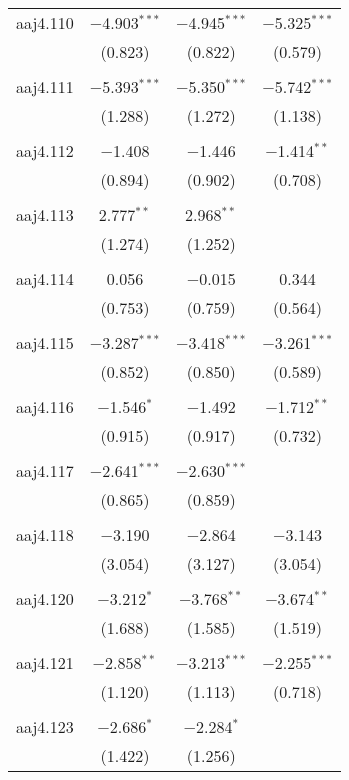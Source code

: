 \begin{table}[!htbp]
\begin{tabular}{@{\extracolsep{5pt}}lccc}
 aaj4.110 & $-$4.903$^{***}$ & $-$4.945$^{***}$ & $-$5.325$^{***}$ \\ 
  & (0.823) & (0.822) & (0.579) \\ 
  & & & \\ 
 aaj4.111 & $-$5.393$^{***}$ & $-$5.350$^{***}$ & $-$5.742$^{***}$ \\ 
  & (1.288) & (1.272) & (1.138) \\ 
  & & & \\ 
 aaj4.112 & $-$1.408 & $-$1.446 & $-$1.414$^{**}$ \\ 
  & (0.894) & (0.902) & (0.708) \\ 
  & & & \\ 
 aaj4.113 & 2.777$^{**}$ & 2.968$^{**}$ &  \\ 
  & (1.274) & (1.252) &  \\ 
  & & & \\ 
 aaj4.114 & 0.056 & $-$0.015 & 0.344 \\ 
  & (0.753) & (0.759) & (0.564) \\ 
  & & & \\ 
 aaj4.115 & $-$3.287$^{***}$ & $-$3.418$^{***}$ & $-$3.261$^{***}$ \\ 
  & (0.852) & (0.850) & (0.589) \\ 
  & & & \\ 
 aaj4.116 & $-$1.546$^{*}$ & $-$1.492 & $-$1.712$^{**}$ \\ 
  & (0.915) & (0.917) & (0.732) \\ 
  & & & \\ 
 aaj4.117 & $-$2.641$^{***}$ & $-$2.630$^{***}$ &  \\ 
  & (0.865) & (0.859) &  \\ 
  & & & \\ 
 aaj4.118 & $-$3.190 & $-$2.864 & $-$3.143 \\ 
  & (3.054) & (3.127) & (3.054) \\ 
  & & & \\ 
 aaj4.120 & $-$3.212$^{*}$ & $-$3.768$^{**}$ & $-$3.674$^{**}$ \\ 
  & (1.688) & (1.585) & (1.519) \\ 
  & & & \\ 
 aaj4.121 & $-$2.858$^{**}$ & $-$3.213$^{***}$ & $-$2.255$^{***}$ \\ 
  & (1.120) & (1.113) & (0.718) \\ 
  & & & \\ 
 aaj4.123 & $-$2.686$^{*}$ & $-$2.284$^{*}$ &  \\ 
  & (1.422) & (1.256) &  \\ 

\end{tabular}
\end{table}
